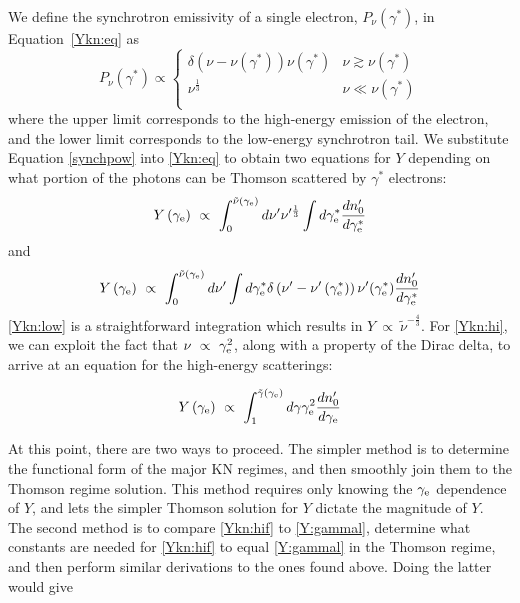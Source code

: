 \documentclass[fleqn,usenatbib]{mnras}
\begin{document}
We define the synchrotron emissivity of a single electron, $P_{\nu}\left(\gamma^*\right)$, in Equation~\ref{Ykn:eq} as
\begin{equation}
\label{synchpow}
P_{\nu}\left(\gamma^{*}\right) \propto \begin{cases} 
       \delta\left(\nu-\nu\left(\gamma^{*}\right)\right)\nu(\gamma^{*})& \nu \gtrsim \nu\left(\gamma^{*}\right)\\
      \nu^{\frac{1}{3}}& \nu \ll \nu\left(\gamma^*\right)\\
   \end{cases}
\end{equation}
where the upper limit corresponds to the high-energy emission of the electron, and the lower limit corresponds to the low-energy synchrotron tail. We substitute Equation \ref{synchpow} into \ref{Ykn:eq} to obtain two equations for $Y$ depending on what portion of the photons can be Thomson scattered by $\gamma^*$ electrons:
\begin{equation}
\label{Ykn:low}
    Y\left(\gamma_{\rm e}\right) \ \propto \  \int_{0}^{\Tilde{\nu}\left(\gamma_{\rm e}\right)}d\nu' \nu'^{\frac{1}{3}}\int d\gamma_{\rm e}^*\frac{d n_0^{\prime}}{d\gamma_{\rm e}^*}
\end{equation}
and 
\begin{equation}
\label{Ykn:hi}
    Y\left(\gamma_{\rm e}\right) \ \propto \  \int_{0}^{\Tilde{\nu}\left(\gamma_{\rm e}\right)}d\nu'\int d\gamma_{\rm e}^*\delta\left(\nu'-\nu'\left(\gamma_{\rm e}^{*}\right)\right)\nu'(\gamma_{\rm e}^{*}) \frac{d n_0^{\prime}}{d\gamma_{\rm e}^*}
\end{equation}
\ref{Ykn:low} is a straightforward integration which results in $Y\ \propto\ \tilde{\nu}^{-\frac{4}{3}}$. For \ref{Ykn:hi}, we can exploit the fact that $\nu\ \propto\ \gamma_{\rm e}^2$, along with a property of the Dirac delta, to arrive at an equation for the high-energy scatterings:

\begin{equation}
\label{Ykn:hif}
    Y\left(\gamma_{\rm e}\right) \ \propto \  \int_{1}^{\Tilde{\gamma}\left(\gamma_{\rm e}\right)} d\gamma\gamma_{\rm e}^{2} \frac{d n_0^{\prime}}{d\gamma_{\rm e}}
\end{equation}

At this point, there are two ways to proceed. The simpler method is to determine the functional form of the major KN regimes, and then smoothly join them to the Thomson regime solution. This method requires only knowing the $\gamma_{\rm e}$ dependence of $Y$, and lets the simpler Thomson solution for $Y$ dictate the magnitude of $Y$. The second method is to compare \ref{Ykn:hif} to \ref{Y:gammal}, determine what constants are needed for \ref{Ykn:hif} to equal \ref{Y:gammal} in the Thomson regime, and then perform similar derivations to the ones found above. Doing the latter would give
\end{document}
